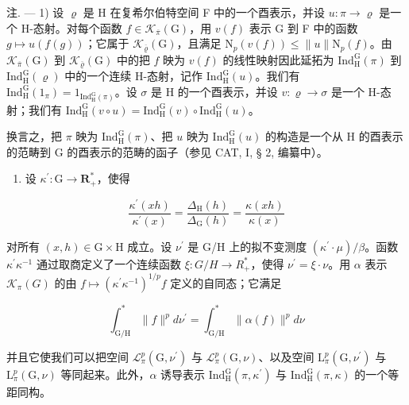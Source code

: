  注. --- 1) 设 \(\varrho\) 是 H 在复希尔伯特空间 F 中的一个酉表示，并设 \(u\colon\pi\to\varrho\) 是一个 H-态射。对每个函数 \(f\in\mathcal{K}_{\overline{\pi}}(\mathrm{G})\)，用 \(v(f)\) 表示 G 到 F 中的函数 \(g\mapsto u(f(g))\)；它属于 \(\mathcal{K}_{\overline{\varrho}}(\mathrm{G})\)，且满足 \(\mathrm{N}_{p}(v(f))\leqslant\|u\|\mathrm{N}_{p}(f)\)。由 \(\mathcal{K}_{\overline{\pi}}(\mathrm{G})\) 到 \(\mathcal{K}_{\overline{\varrho}}(\mathrm{G})\) 中的把 \(f\) 映为 \(v(f)\) 的线性映射因此延拓为 \(\mathrm{Ind}_{\mathrm{H}}^{\mathrm{G}}(\pi)\) 到 \(\mathrm{Ind}_{\mathrm{H}}^{\mathrm{G}}(\varrho)\) 中的一个连续 H-态射，记作 \(\mathrm{Ind}_{\mathrm{H}}^{\mathrm{G}}(u)\)。我们有 \(\mathrm{Ind}_{\mathrm{H}}^{\mathrm{G}}(1_{\pi})=1_{\mathrm{Ind}_{\mathrm{H}}^{\mathrm{G}}(\pi)}\)。设 \(\sigma\) 是 H 的一个酉表示，并设 \(v\colon\varrho\to\sigma\) 是一个 H-态射；我们有 \(\mathrm{Ind}_{\mathrm{H}}^{\mathrm{G}}(v\circ u)=\mathrm{Ind}_{\mathrm{H}}^{\mathrm{G}}(v)\circ\mathrm{Ind}_{\mathrm{H}}^{\mathrm{G}}(u)\)。

换言之，把 \(\pi\) 映为 \(\mathrm{Ind}_{\mathrm{H}}^{\mathrm{G}}(\pi)\)、把 \(u\) 映为 \(\mathrm{Ind}_{\mathrm{H}}^{\mathrm{G}}(u)\) 的构造是一个从 H 的酉表示的范畴到 G 的酉表示的范畴的函子（参见 CAT, I, § 2, 编纂中）。

\begin{enumerate}
\def\labelenumi{\arabic{enumi})}
\setcounter{enumi}{1}
\tightlist
\item
  设 \(\kappa^{\prime}\colon \mathrm{G}\to \mathbf{R}_{+}^{*}\)，使得
\end{enumerate}

\[
\frac {\kappa^ {\prime} (x h)}{\kappa^ {\prime} (x)} = \frac {\Delta_ {\mathrm{H}} (h)}{\Delta_ {\mathrm{G}} (h)} = \frac {\kappa (x h)}{\kappa (x)}
\]

 对所有 \((x,h)\in\mathrm{G}\times\mathrm{H}\) 成立。设 \(\nu^{\prime}\) 是 G/H 上的拟不变测度 \((\kappa^{\prime}\cdot\mu)/\beta\)。函数 \(\kappa^{\prime}\kappa^{-1}\) 通过取商定义了一个连续函数 \(\xi\colon G/H\to R_{+}^{*}\)，使得 \(\nu^{\prime}=\xi\cdot\nu\)。用 \(\alpha\) 表示 \(\mathcal{K}_{\pi}(G)\) 的由 \(f\mapsto(\kappa^{\prime}\kappa^{-1})^{1/p}f\) 定义的自同态；它满足

\[
\int_ {\mathrm{G} / \mathrm{H}} ^ {*} \| f \| ^ {p} d \nu^ {\prime} = \int_ {\mathrm{G} / \mathrm{H}} ^ {*} \| \alpha (f) \| ^ {p} d \nu
\]

并且它使我们可以把空间 \(\mathcal{L}_{\pi}^{p}(\mathrm{G},\nu^{\prime})\) 与 \(\mathcal{L}_{\pi}^{p}(\mathrm{G},\nu)\)、以及空间 \(\mathrm{L}_{\pi}^{p}(\mathrm{G},\nu^{\prime})\) 与 \(\mathrm{L}_{\pi}^{p}(\mathrm{G},\nu)\) 等同起来。此外，\(\alpha\) 诱导表示 \(\mathrm{Ind}_{\mathrm{H}}^{\mathrm{G}}(\pi,\kappa^{\prime})\) 与 \(\mathrm{Ind}_{\mathrm{H}}^{\mathrm{G}}(\pi,\kappa)\) 的一个等距同构。

